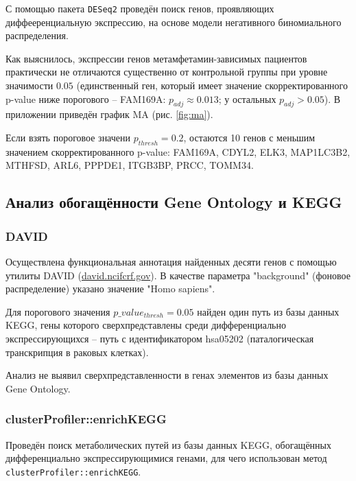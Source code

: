 \documentclass[a4paper,12pt]{article}
\begin{document}
С помощью пакета \texttt{DESeq2} проведён поиск генов, проявляющих диффееренциальную экспрессию, на основе модели негативного биномиального распределения.

Как выяснилось, экспрессии генов метамфетамин-зависимых пациентов практически не отличаются существенно от контрольной группы при уровне значимости $ 0.05 $ (единственный ген, который имеет значение скорректированного p-value  ниже порогового -- FAM169A: $ p_{adj} \approx 0.013  $; у остальных $ p_{adj} > 0.05 $).
В приложении приведён график MA (рис. \ref{fig:ma}).

Если взять пороговое значени $ p_{thresh} = 0.2 $, остаются 10 генов с меньшим значением скорректированного p-value: FAM169A, \hspace{0pt} CDYL2, \hspace{0pt} ELK3, \hspace{0pt}  MAP1LC3B2, \hspace{0pt} MTHFSD, \hspace{0pt} ARL6, PPPDE1, ITGB3BP, PRCC, TOMM34.

\subsection{Анализ обогащённости Gene Ontology и KEGG}

\subsubsection{DAVID}

Осуществлена функциональная аннотация найденных десяти генов с помощью утилиты DAVID (\href{https://david.ncifcrf.gov}{david.ncifcrf.gov}).
В качестве параметра "background" \hspace{0pt} (фоновое распределение) указано значение "Homo sapiens".

Для порогового значения $ p\_value_{thresh} = 0.05 $ найден один путь из базы данных KEGG, гены которого сверхпредставлены среди дифференциально экспрессирующихся -- путь с идентификатором hsa05202 (паталогическая транскрипция в раковых клетках).

Анализ не выявил сверхпредставленности в генах элементов из базы данных Gene Ontology.

\subsubsection{clusterProfiler::enrichKEGG}

Проведён поиск метаболических путей из базы данных KEGG, обогащённых дифференциально экспрессирующимися генами, для чего использован метод \texttt{clusterProfiler::enrichKEGG}.
\end{document}
